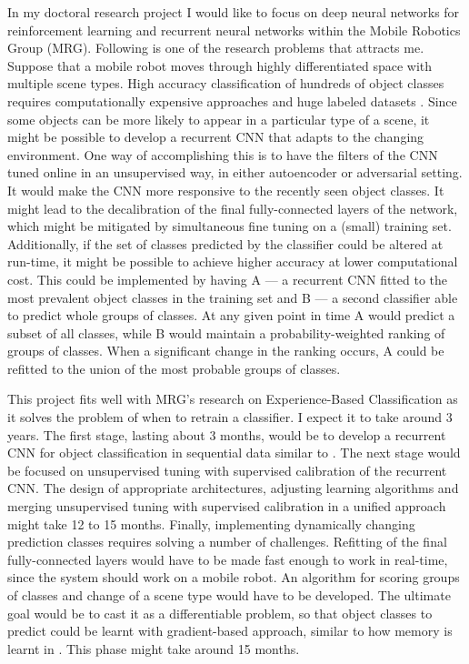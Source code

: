 \documentclass[12pt]{article}
\begin{document}
In my doctoral research project I would like to focus on deep neural networks for reinforcement learning and recurrent neural networks within the Mobile Robotics Group (MRG). Following is one of the research problems that attracts me. Suppose that a mobile robot moves through highly differentiated space with multiple scene types. High accuracy classification of hundreds of object classes requires computationally expensive approaches and huge labeled datasets \cite{imagenet}. Since some objects can be more likely to appear in a particular type of a scene, it might be possible to develop a recurrent CNN that adapts to the changing environment. One way of accomplishing this is to have the filters of the CNN tuned online in an unsupervised way, in either autoencoder \cite{autoencoders} or adversarial \cite{adversarial} setting. It would make the CNN more responsive to the recently seen object classes. It might lead to the decalibration of the final fully-connected layers of the network, which might be mitigated by simultaneous fine tuning on a (small) training set. Additionally, if the set of classes predicted by the classifier could be altered at run-time, it might be possible to achieve higher accuracy at lower computational cost. This could be implemented by having A --- a recurrent CNN fitted to the most prevalent object classes in the training set and B --- a second classifier able to predict whole groups of classes. At any given point in time A would predict a subset of all classes, while B would maintain a probability-weighted ranking of groups of classes. When a significant change in the ranking occurs, A could be refitted to the union of the most probable groups of classes. 

This project fits well with MRG's research on Experience-Based Classification \cite{experience} as it solves the problem of when to retrain a classifier. I expect it to take around 3 years. The first stage, lasting about 3 months, would be to develop a recurrent CNN for object classification in sequential data similar to \cite{rcnn}. The next stage would be focused on unsupervised tuning with supervised calibration of the recurrent CNN. The design of appropriate architectures, adjusting learning algorithms and merging unsupervised tuning with supervised calibration in a unified approach might take 12 to 15 months. Finally, implementing dynamically changing prediction classes requires solving a number of challenges. Refitting of the final fully-connected layers would have to be made fast enough to work in real-time, since the system should work on a mobile robot. An algorithm for scoring groups of classes and change of a scene type would have to be developed. The ultimate goal would be to cast it as a differentiable problem, so that object classes to predict could be learnt with gradient-based approach, similar to how memory is learnt in \cite{memory}. This phase might take around 15 months.
\end{document}
